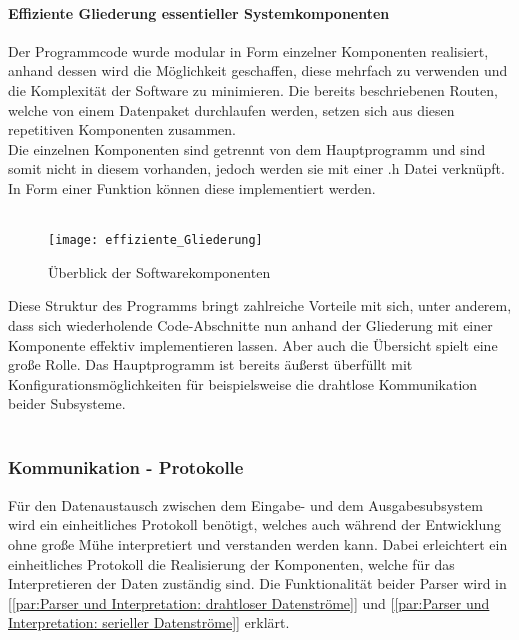 \documentclass[titlepage,12pt,twoside]{article}
\begin{document}
\paragraph{Effiziente Gliederung essentieller Systemkomponenten}
\label{par:Effiziente Gliederung essentieller Systemkomponenten}
\hfill \break
\hfill \break
Der Programmcode wurde modular in Form einzelner Komponenten realisiert, anhand dessen wird die Möglichkeit geschaffen, diese mehrfach zu verwenden und 
die Komplexität der Software zu minimieren. Die bereits beschriebenen Routen, welche von einem Datenpaket durchlaufen werden, setzen sich aus diesen 
repetitiven Komponenten zusammen. \\
Die einzelnen Komponenten sind getrennt von dem Hauptprogramm und sind somit nicht in diesem vorhanden, jedoch werden sie mit einer .h Datei verknüpft. 
In Form einer Funktion können diese implementiert werden. \\
\\
\begin{figure}[H]
	\begin{center}
		\scalebox{1}
		{\texttt{[image: effiziente\_Gliederung]}}
		\caption{Überblick der Softwarekomponenten}
		\label{fig:effiziente_Gliederung}		
	\end{center}
\end{figure}
\hfill \break
Diese Struktur des Programms bringt zahlreiche Vorteile mit sich, unter anderem, dass sich wiederholende Code-Abschnitte nun anhand der Gliederung mit 
einer Komponente effektiv implementieren lassen. Aber auch die Übersicht spielt eine große Rolle. Das Hauptprogramm ist bereits äußerst überfüllt 
mit Konfigurationsmöglichkeiten für beispielsweise die drahtlose Kommunikation beider Subsysteme. \\
\\

\subsubsection{Kommunikation - Protokolle}
\label{chap:Kommunikation-Protokolle}
Für den Datenaustausch zwischen dem Eingabe- und dem Ausgabesubsystem wird ein einheitliches Protokoll benötigt, welches auch während der Entwicklung 
ohne große Mühe interpretiert und verstanden werden kann. Dabei erleichtert ein einheitliches Protokoll die Realisierung der Komponenten, welche für das 
Interpretieren der Daten zuständig sind. Die Funktionalität beider Parser wird in [\textcolor{blue}{\autoref{par:Parser und Interpretation: drahtloser Datenströme}}]
und [\textcolor{blue}{\autoref{par:Parser und Interpretation: serieller Datenströme}}] erklärt. \\
\\
\end{document}

